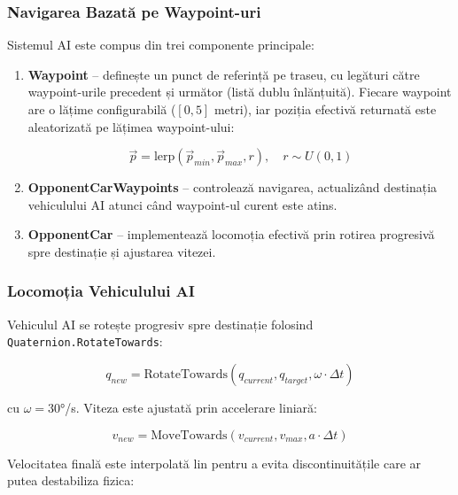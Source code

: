 \subsubsection{Navigarea Bazată pe Waypoint-uri}

Sistemul AI este compus din trei componente principale:

\begin{enumerate}
    \item \textbf{Waypoint} -- definește un punct de referință pe traseu, cu legături către waypoint-urile precedent și următor (listă dublu înlănțuită). Fiecare waypoint are o lățime configurabilă ($[0, 5]$ metri), iar poziția efectivă returnată este aleatorizată pe lățimea waypoint-ului:
    
    \begin{equation}
        \vec{p} = \text{lerp}(\vec{p}_{min}, \vec{p}_{max}, r), \quad r \sim U(0, 1)
    \end{equation}
    
    \item \textbf{OpponentCarWaypoints} -- controlează navigarea, actualizând destinația vehiculului AI atunci când waypoint-ul curent este atins.
    
    \item \textbf{OpponentCar} -- implementează locomoția efectivă prin rotirea progresivă spre destinație și ajustarea vitezei.
\end{enumerate}

\subsubsection{Locomoția Vehiculului AI}

Vehiculul AI se rotește progresiv spre destinație folosind \texttt{Quaternion.RotateTowards}:

\begin{equation}
    q_{new} = \text{RotateTowards}(q_{current}, q_{target}, \omega \cdot \Delta t)
\end{equation}

cu $\omega = 30°$/s. Viteza este ajustată prin accelerare liniară:

\begin{equation}
    v_{new} = \text{MoveTowards}(v_{current}, v_{max}, a \cdot \Delta t)
\end{equation}

Velocitatea finală este interpolată lin pentru a evita discontinuitățile care ar putea destabiliza fizica:

